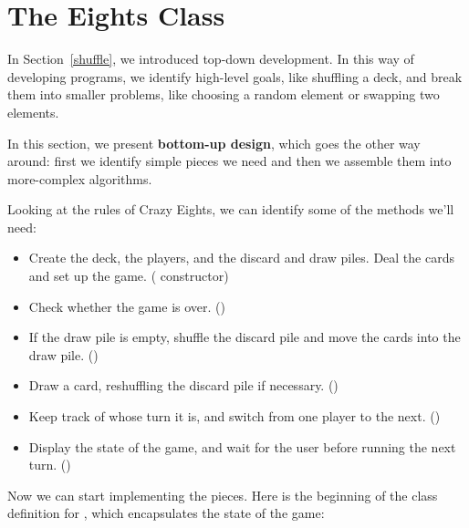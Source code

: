 \section{The Eights Class}


In Section~\ref{shuffle}, we introduced top-down development. In this way of developing programs, we identify high-level goals, like shuffling a deck, and break them into smaller problems, like choosing a random element or swapping two elements.


In this section, we present {\bf bottom-up design}, which goes the other way around: first we identify simple pieces we need and then we assemble them into more-complex algorithms.

Looking at the rules of Crazy Eights, we can identify some of the methods we'll need:

\begin{itemize}

\item Create the deck, the players, and the discard and draw piles. Deal the cards and set up the game. ( constructor)

\item Check whether the game is over. ()

\item If the draw pile is empty, shuffle the discard pile and move the cards into the draw pile. ()

\item Draw a card, reshuffling the discard pile if necessary. ()

\item Keep track of whose turn it is, and switch from one player to the next. ()

\item Display the state of the game, and wait for the user before running the next turn. ()

\end{itemize}

Now we can start implementing the pieces.
Here is the beginning of the class definition for , which encapsulates the state of the game:


\begin{code}
public class Eights {

    private Player one;
    private Player two;
    private Hand drawPile;
    private Hand discardPile;
    private Scanner in;
\end{code}

